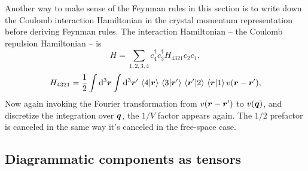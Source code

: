 \documentclass[hyperref, a4paper]{report}
\begin{document}
Another way to make sense of the Feynman rules in this section is 
to write down the Coulomb interaction Hamiltonian in the 
crystal momentum representation
before deriving Feynman rules.
The interaction Hamiltonian -- the Coulomb repulsion Hamiltonian -- is 
\begin{equation}
    H = \sum_{1, 2, 3, 4} c^\dagger_4 c^\dagger_3 H_{4321} c_2 c_1,
\end{equation}
\begin{equation}
    H_{4321} = \frac{1}{2} \int \dd[3]{\vb*{r}} \int \dd[3]{\vb*{r}'}
    \braket*{4}{\vb*{r}} \braket*{3}{\vb*{r}'} \braket*{\vb*{r}'}{2} \braket*{\vb*{r}}{1}
    v(\vb*{r} - \vb*{r}'),
\end{equation}
Now again invoking the Fourier transformation from $v(\vb*{r} - \vb*{r}')$ to $v(\vb*{q})$,
and discretize the integration over $\vb*{q}$,
the $1/V$ factor appears again.
The $1/2$ prefactor is canceled in the same way it's canceled in the free-space case.

\subsection{Diagrammatic components as tensors}\label{sec:crystal-tensor}
\end{document}
